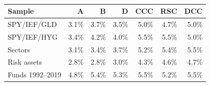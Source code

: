 \begin{table}[t]
\centering{}\footnotesize\setlength{\tabcolsep}{5pt}
\caption{}\label{tab:hits}
\begin{tabular}{lrrrrrr}
\toprule
Sample & A & B & D & CCC & RSC & DCC \\
\midrule
SPY/IEF/GLD & 3.1\% & 3.7\% & 3.5\% & 5.0\% & 4.7\% & 5.0\% \\
SPY/IEF/HYG & 3.4\% & 4.2\% & 4.0\% & 5.5\% & 5.5\% & 5.0\% \\
Sectors & 3.1\% & 3.4\% & 3.7\% & 5.2\% & 5.4\% & 5.5\% \\
Risk assets & 2.8\% & 2.8\% & 3.0\% & 4.3\% & 4.6\% & 4.7\% \\
Funds 1992--2019 & 4.8\% & 5.4\% & 5.3\% & 5.5\% & 5.2\% & 5.5\% \\
\bottomrule
\end{tabular}
\end{table}
